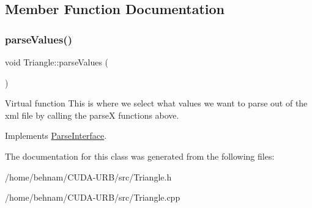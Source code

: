 \subsection{Member Function Documentation}
\mbox{\label{classTriangle_a3b08ac99b202202bf7dbf2504da91ba1}} 
\subsubsection{\texorpdfstring{parse\+Values()}{parseValues()}}
{\footnotesize\ttfamily void Triangle\+::parse\+Values (\begin{DoxyParamCaption}{ }\end{DoxyParamCaption})\hspace{0.3cm}{\ttfamily [virtual]}}

Virtual function This is where we select what values we want to parse out of the xml file by calling the parseX functions above. 

Implements \hyperlink{classParseInterface_afca32108192ba0997c9e5a78189b0cbc}{Parse\+Interface}.



The documentation for this class was generated from the following files\+:\begin{DoxyCompactItemize}
\item 
/home/behnam/\+C\+U\+D\+A-\/\+U\+R\+B/src/Triangle.\+h\item 
/home/behnam/\+C\+U\+D\+A-\/\+U\+R\+B/src/Triangle.\+cpp\end{DoxyCompactItemize}
